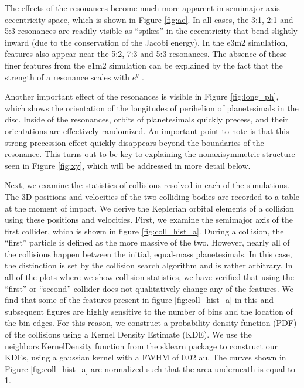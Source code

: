 The effects of the resonances become much more apparent in semimajor axis-eccentricity space, which is shown in Figure 
\ref{fig:ae}. In all cases, the 3:1, 2:1 and 5:3 resonances are readily visible as ``spikes'' in the eccentricity that bend slightly 
inward (due to the conservation of the Jacobi energy). In the e3m2 simulation, features also appear near the 5:2, 7:3 and 5:3 
resonances. The absence of these finer features from the e1m2 simulation can be explained by the fact that the strength of a 
resonance scales with $e^{q}$ \cite{malhotra94}.

Another important effect of the resonances is visible in Figure \ref{fig:long_ph}, which shows the orientation of the longitudes of 
perihelion of planetesimals in the disc. Inside of the resonances, orbits of planetesimals quickly precess, and their orientations are 
effectively randomized. An important point to note is that this strong precession effect quickly disappears beyond the boundaries 
of the resonance. This turns out to be key to explaining the nonaxisymmetric structure seen in Figure \ref{fig:xy}, which will be 
addressed in more detail below.

Next, we examine the statistics of collisions resolved in each of the simulations. The 3D positions and velocities of the two 
colliding bodies are recorded to a table at the moment of impact. We derive the Keplerian orbital elements of a collision using 
these positions and velocities. First, we examine the semimajor axis of the first collider, which is shown in figure 
\ref{fig:coll_hist_a}. During a collision, the ``first'' particle is defined as the more massive of the two. However, nearly all of the 
collisions happen between the initial, equal-mass planetesimals. In this case, the distinction is set by the collision search 
algorithm and is rather arbitrary. In all of the plots where we show collision statistics, we have verified that using the ``first'' or 
``second'' collider does not qualitatively change any of the features. We find that some of the features present in figure 
\ref{fig:coll_hist_a} in this and subsequent figures are highly sensitive to the number of bins and the location of the bin edges. 
For this reason, we construct a probability density function (PDF) of the collisions using a Kernel Density Estimate (KDE). We 
use the {\sc neighbors.KernelDensity} function from the {\sc sklearn} \cite{scikit-learn} package to construct our KDEs, using a 
gaussian kernel with a FWHM of 0.02 au. The curves shown in Figure \ref{fig:coll_hist_a} are normalized such that the area 
underneath is equal to 1.

